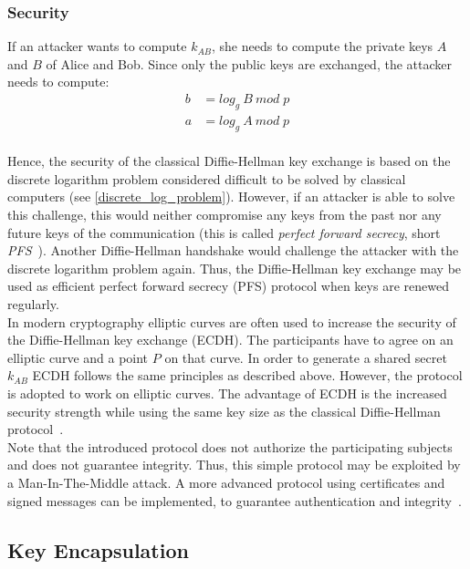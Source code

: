 \subsubsection{Security}
If an attacker wants to compute $k_{AB}$, she needs to compute the private keys $A$ and $B$ of Alice and Bob. Since only the public keys are exchanged, the attacker needs to compute:
\begin{equation*}
\begin{split}
b &= log_g\:B\:mod\;p\\ 
a &= log_g\:A\:mod\;p
\end{split}
\end{equation*}
\\
Hence, the security of the classical Diffie-Hellman key exchange is based on the discrete logarithm problem considered difficult to be solved by classical computers (see \autoref{discrete_log_problem}). However, if an attacker is able to solve this challenge, this would neither compromise any keys from the past nor any future keys of the communication (this is called \textit{perfect forward secrecy}, short \textit{\gls{PFS}}~\parencite{ITSicherheit}). Another Diffie-Hellman handshake would challenge the attacker with the discrete logarithm problem again. Thus, the Diffie-Hellman key exchange may be used as efficient perfect forward secrecy (\gls{PFS}) protocol when keys are renewed regularly.\\
In modern cryptography elliptic curves are often used to increase the security of the Diffie-Hellman key exchange (\gls{ECDH}). The participants have to agree on an elliptic curve and a point $P$ on that curve. In order to generate a shared secret $k_{AB}$ \gls{ECDH} follows the same principles as described above. However, the protocol is adopted to work on elliptic curves. The advantage of \gls{ECDH} is the increased security strength while using the same key size as the classical Diffie-Hellman protocol~\parencite{ITSicherheit}.
\\
Note that the introduced protocol does not authorize the participating subjects and does not guarantee integrity. Thus, this simple protocol may be exploited by a Man-In-The-Middle attack. A more advanced protocol using certificates and signed messages can be implemented, to guarantee authentication and integrity~\parencite{ITSicherheit}.

\subsection{Key Encapsulation}

